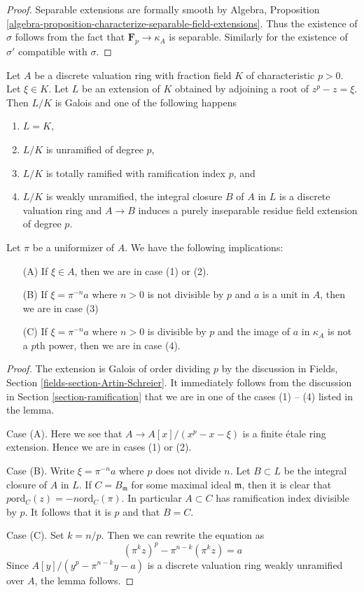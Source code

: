 \begin{proof}
Separable extensions are formally smooth by Algebra, Proposition
\ref{algebra-proposition-characterize-separable-field-extensions}.
Thus the existence of $\sigma$ follows from the fact that
$\mathbf{F}_p \to \kappa_A$ is separable.
Similarly for the existence of $\sigma'$ compatible with $\sigma$.
\end{proof}

\begin{lemma}
\label{lemma-pre-characteristic-p-case}
Let $A$ be a discrete valuation ring with fraction field $K$ of characteristic
$p > 0$. Let $\xi \in K$. Let $L$ be an extension of $K$ obtained by
adjoining a root of $z^p - z = \xi$. Then $L/K$ is Galois and one of the
following happens
\begin{enumerate}
\item $L = K$,
\item $L / K$ is unramified of degree $p$,
\item $L / K$ is totally ramified with ramification index $p$, and
\item $L / K$ is weakly unramified, the integral closure $B$ of $A$ in $L$
is a discrete valuation ring and $A \to B$ induces a purely inseparable
residue field extension of degree $p$.
\end{enumerate}
Let $\pi$ be a uniformizer of $A$. We have the following implications:
\begin{enumerate}
\item[(A)] If $\xi \in A$, then we are in case (1) or (2).
\item[(B)] If $\xi = \pi^{-n}a$ where $n > 0$ is not divisible by
$p$ and $a$ is a unit in $A$, then we are in case (3)
\item[(C)] If $\xi = \pi^{-n} a$ where $n > 0$ is divisible by $p$ and
the image of $a$ in $\kappa_A$ is not a $p$th power, then we are in case (4).
\end{enumerate}
\end{lemma}

\begin{proof}
The extension is Galois of order dividing $p$ by the discussion in
Fields, Section \ref{fields-section-Artin-Schreier}.
It immediately follows from the discussion in
Section \ref{section-ramification} that we are in one of the cases (1) -- (4)
listed in the lemma.

\medskip\noindent
Case (A). Here we see that $A \to A[x]/(x^p - x - \xi)$ is a finite
\'etale ring extension. Hence we are in cases (1) or (2).

\medskip\noindent
Case (B). Write $\xi = \pi^{-n}a$ where $p$ does not divide $n$.
Let $B \subset L$ be the integral closure of $A$ in $L$.
If $C = B_\mathfrak m$ for some maximal ideal $\mathfrak m$,
then it is clear that $p \text{ord}_C(z) = -n \text{ord}_C(\pi)$.
In particular $A \subset C$ has ramification index divisible by $p$.
It follows that it is $p$ and that $B = C$.

\medskip\noindent
Case (C). Set $k = n/p$. Then we can rewrite the equation as
$$
(\pi^kz)^p - \pi^{n - k} (\pi^kz) = a
$$
Since $A[y]/(y^p - \pi^{n - k}y - a)$ is a discrete valuation ring
weakly unramified over $A$, the lemma follows.
\end{proof}

